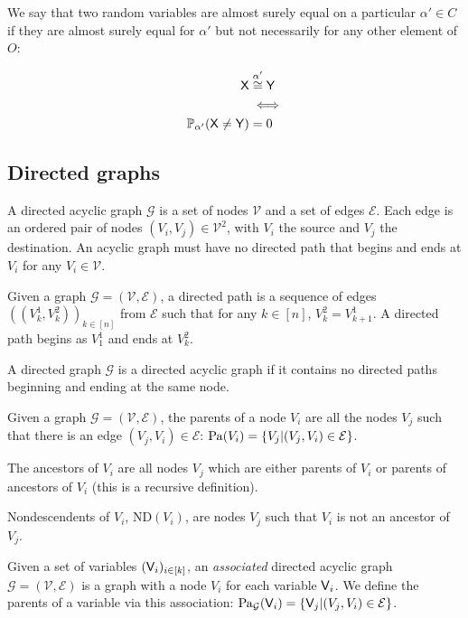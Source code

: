 We say that two random variables are almost surely equal on a particular $\alpha'\in C$ if they are almost surely equal for $\alpha'$ but not necessarily for any other element of $O$:

\begin{align}
	\mathsf{X} &\overset{\alpha'}{\cong} \mathsf{Y}\\
	&\iff\\
	\mathbb{P}_{\alpha'}(\mathsf{X}\neq \mathsf{Y}) &= 0
\end{align}


\subsection{Directed graphs}\label{sec:d_graphs}


\begin{definition}
A directed acyclic graph $\mathcal{G}$ is a set of nodes $\mathcal{V}$ and a set of edges $\mathcal{E}$. Each edge is an ordered pair of nodes $(V_i,V_j)\in \mathcal{V}^2$, with $V_i$ the source and $V_j$ the destination. An acyclic graph must have no directed path that begins and ends at $V_i$ for any $V_i\in\mathcal{V}$.
\end{definition}

\begin{definition}
Given a graph $\mathcal{G}=(\mathcal{V},\mathcal{E})$, a directed path is a sequence of edges $((V^1_{k},V^2_{k}))_{k\in [n]}$ from $\mathcal{E}$ such that for any $k\in [n]$, $V^2_k=V^1_{k+1}$. A directed path begins as $V^1_1$ and ends at $V^2_k$.
\end{definition}

\begin{definition}
A directed graph $\mathcal{G}$ is a directed acyclic graph if it contains no directed paths beginning and ending at the same node.
\end{definition}

\begin{definition}
Given a graph $\mathcal{G}=(\mathcal{V},\mathcal{E})$, the parents of a node $V_i$ are all the nodes $V_j$ such that there is an edge $(V_j, V_i)\in \mathcal{E}$: $\mathrm{Pa}(V_i)=\{V_j|(V_j,V_i)\in \mathcal{E}\}$.

The ancestors of $V_i$ are all nodes $V_j$ which are either parents of $V_i$ or parents of ancestors of $V_i$ (this is a recursive definition).

Nondescendents of $V_i$, $\mathrm{ND}(V_i)$, are nodes $V_j$ such that $V_i$ is not an ancestor of $V_j$.
\end{definition}

\begin{definition}\label{def:mga}
Given a set of variables $(\mathsf{V}_i)_{i\in [k]}$, an \emph{associated} directed acyclic graph $\mathcal{G}=(\mathcal{V},\mathcal{E})$ is a graph with a node $V_i$ for each variable $\mathsf{V}_i$. We define the parents of a variable via this association: $\mathrm{Pa}_\mathcal{G}(\mathsf{V}_i)=\{\mathsf{V}_j|(V_j,V_i)\in \mathcal{E}\}$.
\end{definition}

